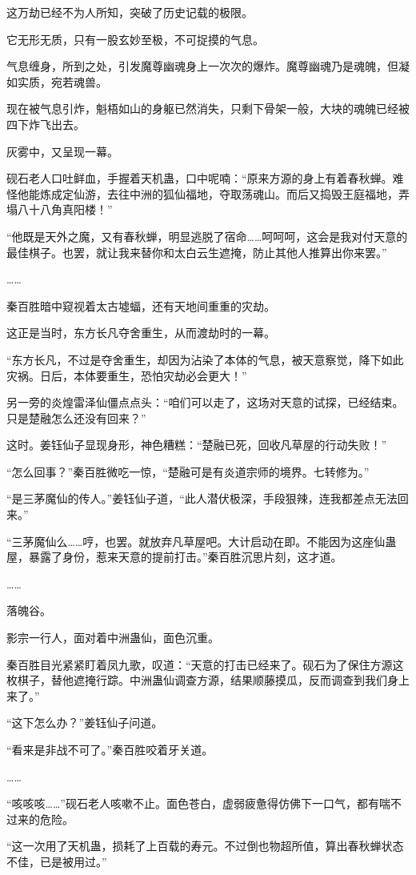 \begin{this_body}
这万劫已经不为人所知，突破了历史记载的极限。

它无形无质，只有一股玄妙至极，不可捉摸的气息。

气息缠身，所到之处，引发魔尊幽魂身上一次次的爆炸。魔尊幽魂乃是魂魄，但凝如实质，宛若魂兽。

现在被气息引炸，魁梧如山的身躯已然消失，只剩下骨架一般，大块的魂魄已经被四下炸飞出去。

灰雾中，又呈现一幕。

砚石老人口吐鲜血，手握着天机蛊，口中呢喃：“原来方源的身上有着春秋蝉。难怪他能炼成定仙游，去往中洲的狐仙福地，夺取荡魂山。而后又捣毁王庭福地，弄塌八十八角真阳楼！”

“他既是天外之魔，又有春秋蝉，明显逃脱了宿命……呵呵呵，这会是我对付天意的最佳棋子。也罢，就让我来替你和太白云生遮掩，防止其他人推算出你来罢。”

……

秦百胜暗中窥视着太古墟蝠，还有天地间重重的灾劫。

这正是当时，东方长凡夺舍重生，从而渡劫时的一幕。

“东方长凡，不过是夺舍重生，却因为沾染了本体的气息，被天意察觉，降下如此灾祸。日后，本体要重生，恐怕灾劫必会更大！”

另一旁的炎煌雷泽仙僵点点头：“咱们可以走了，这场对天意的试探，已经结束。只是楚融怎么还没有回来？”

这时。姜钰仙子显现身形，神色糟糕：“楚融已死，回收凡草屋的行动失败！”

“怎么回事？”秦百胜微吃一惊，“楚融可是有炎道宗师的境界。七转修为。”

“是三茅魔仙的传人。”姜钰仙子道，“此人潜伏极深，手段狠辣，连我都差点无法回来。”

“三茅魔仙么……哼，也罢。就放弃凡草屋吧。大计启动在即。不能因为这座仙蛊屋，暴露了身份，惹来天意的提前打击。”秦百胜沉思片刻，这才道。

……

落魄谷。

影宗一行人，面对着中洲蛊仙，面色沉重。

秦百胜目光紧紧盯着凤九歌，叹道：“天意的打击已经来了。砚石为了保住方源这枚棋子，替他遮掩行踪。中洲蛊仙调查方源，结果顺藤摸瓜，反而调查到我们身上来了。”

“这下怎么办？”姜钰仙子问道。

“看来是非战不可了。”秦百胜咬着牙关道。

……

“咳咳咳……”砚石老人咳嗽不止。面色苍白，虚弱疲惫得仿佛下一口气，都有喘不过来的危险。

“这一次用了天机蛊，损耗了上百载的寿元。不过倒也物超所值，算出春秋蝉状态不佳，已是被用过。”


\end{this_body}
